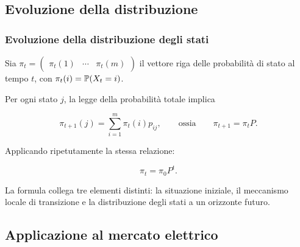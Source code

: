 

\subsection{Evoluzione della distribuzione}%

\begin{frame}%
%

\frametitle{Evoluzione della distribuzione degli stati}%
%

%


Sia $\pi_{t}=
\begin{pmatrix}
\pi_{t}(1) & \cdots & \pi_{t}(m)
\end{pmatrix}
$ il vettore riga delle probabilit\`{a} di stato al tempo $t$, con $\pi
_{t}(i)=\mathbb{P}(X_{t}=i)$.

\medskip

Per ogni stato $j$, la legge della probabilit\`{a} totale implica%

\[
\pi_{t+1}(j) = \sum_{i=1}^{m} \pi_{t}(i)p_{ij}, \qquad\text{ossia} \qquad
\pi_{t+1}=\pi_{t}P.
\]


\medskip

Applicando ripetutamente la stessa relazione:%

\[
\pi_{t}=\pi_{0}P^{t}.
\]


\medskip

\begin{center}
{\small La formula collega tre elementi distinti: la situazione iniziale, il
meccanismo locale di transizione e la distribuzione degli stati a un orizzonte
futuro.}
\end{center}

%

\transboxout
\end{frame}%




\subsection{Applicazione al mercato elettrico}%

